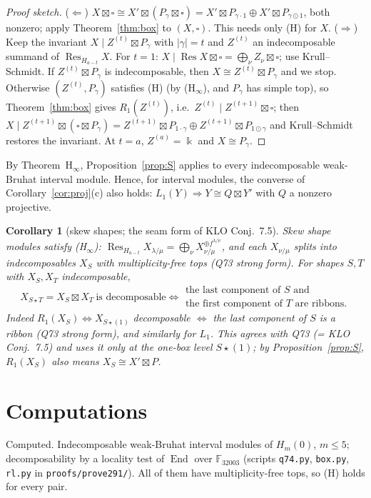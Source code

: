 \documentclass[11pt]{amsart}
\newcommand{\gr}[1]{\textsf{#1}}
\newcommand{\End}{\operatorname{End}}
\newcommand{\Res}{\operatorname{Res}}
\newcommand{\kk}{\Bbbk}
\newcommand{\sq}{\boxtimes}
\newcommand{\bx}{\square}
\theoremstyle{plain}
\newtheorem{corollary}[theorem]{Corollary}
\theoremstyle{definition}
\begin{document}
\begin{proof}[Proof sketch]
($\Leftarrow$) $X\sq\bx\cong X'\sq(P_\gamma\sq\bx)=X'\sq P_{\gamma\cdot1}\oplus X'\sq P_{\gamma\odot1}$, both nonzero; apply Theorem~\ref{thm:box} to $(X,\bx)$. This needs only (H) for $X$.
($\Rightarrow$) Keep the invariant $X\mid Z^{(t)}\sq P_\gamma$ with $|\gamma|=t$ and $Z^{(t)}$ an indecomposable summand of $\Res_{H_{a-t}}X$. For $t=1$: $X\mid\Res X\sq\bx=\bigoplus_\nu Z_\nu\sq\bx$; use Krull--Schmidt. If $Z^{(t)}\sq P_\gamma$ is indecomposable, then $X\cong Z^{(t)}\sq P_\gamma$ and we stop. Otherwise $(Z^{(t)},P_\gamma)$ satisfies (H) (by (H$_\infty$), and $P_\gamma$ has simple top), so Theorem~\ref{thm:box} gives $R_1(Z^{(t)})$, i.e.\ $Z^{(t)}\mid Z^{(t+1)}\sq\bx$; then $X\mid Z^{(t+1)}\sq(\bx\sq P_\gamma)=Z^{(t+1)}\sq P_{1\cdot\gamma}\oplus Z^{(t+1)}\sq P_{1\odot\gamma}$ and Krull--Schmidt restores the invariant. At $t=a$, $Z^{(a)}=\kk$ and $X\cong P_\gamma$.
\end{proof}

By Theorem~H$_\infty$, Proposition~\ref{prop:S} applies to every indecomposable weak-Bruhat interval module. Hence, for interval modules, the converse of Corollary~\ref{cor:proj}(c) also holds: $L_1(Y)\Rightarrow Y\cong Q\sq Y'$ with $Q$ a nonzero projective.

\begin{corollary}[skew shapes; the seam form of KLO Conj.~7.5]\label{cor:shape}
Skew shape modules satisfy (H$_\infty$): $\Res_{H_{a-t}}X_{\lambda/\mu}=\bigoplus_\nu X_{\nu/\mu}^{\oplus f^{\lambda/\nu}}$, and each $X_{\nu/\mu}$ splits into indecomposables $X_S$ with multiplicity-free tops (Q73 strong form). For shapes $S,T$ with $X_S,X_T$ indecomposable,
\[
X_{S\star T}=X_S\sq X_T\ \text{is decomposable}\iff\begin{array}{l}\text{the last component of $S$ and}\\ \text{the first component of $T$ are ribbons.}\end{array}
\]
Indeed $R_1(X_S)\iff X_{S\star(1)}$ decomposable $\iff$ the last component of $S$ is a ribbon (Q73 strong form), and similarly for $L_1$. This agrees with Q73 (= KLO Conj.~7.5) and uses it only at the one-box level $S\star(1)$; by Proposition~\ref{prop:S}, $R_1(X_S)$ also means $X_S\cong X'\sq P$.
\end{corollary}

\section{Computations}\label{sec:data}
\gr{Computed.} Indecomposable weak-Bruhat interval modules of $H_m(0)$, $m\le5$; decomposability by a locality test of $\End$ over $\mathbb F_{32003}$ (scripts \texttt{q74.py}, \texttt{box.py}, \texttt{rl.py} in \texttt{proofs/prove291/}). All of them have multiplicity-free tops, so (H) holds for every pair.
\end{document}
